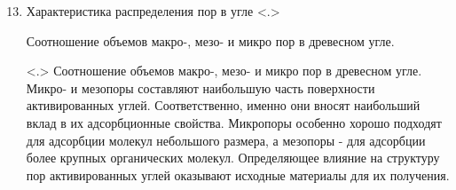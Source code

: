 	\begin{enumerate}
		\setcounter{enumi}{12}
		\item \alert<+>{Характеристика распределения пор в угле}
		\only<.>{
			\begin{block}{}
				Соотношение объемов макро-, мезо- и микро пор в древесном угле.
			\end{block}}
			\note<.>{
				Соотношение объемов макро-, мезо- и микро пор в древесном угле. Микро- и мезопоры составляют наибольшую часть поверхности активированных углей. Соответственно, именно они вносят наибольший вклад в их адсорбционные свойства. Микропоры особенно хорошо подходят для адсорбции молекул небольшого размера, а мезопоры - для адсорбции более крупных органических молекул. Определяющее влияние на структуру пор активированных углей оказывают исходные материалы для их получения.
			}
	\end{enumerate}
